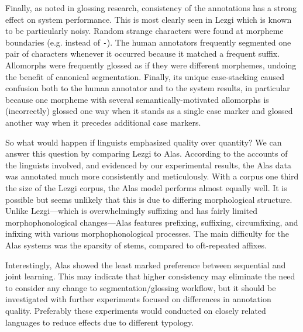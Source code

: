 Finally, as \citet{mcmillan-major_automating_2020} noted in glossing research, consistency of the annotations has a strong effect on system performance. This is most clearly seen in Lezgi which is known to be particularly noisy. Random strange characters were found at morpheme boundaries (e.g. {\tt *} instead of  {\tt -}). The human annotators frequently segmented one pair of characters whenever it occurred because it matched a frequent suffix. Allomorphs were frequently glossed as if they were different morphemes, undoing the benefit of canonical segmentation. Finally, its unique case-stacking caused confusion both to the human annotator and to the system results, in particular because one morpheme with several semantically-motivated allomorphs is (incorrectly) glossed one way when it stands as a single case marker and glossed another way when it precedes additional case markers.

So what would happen if linguists emphasized quality over quantity? We can answer this question by comparing Lezgi to Alas. According to the accounts of the linguists involved, and evidenced by our experimental results, the Alas data was annotated much more consistently and meticulously. With a corpus one third the size of the Lezgi corpus, the Alas model performs almost equally well. It is possible but seems unlikely that this is due to differing morphological structure. Unlike Lezgi---which is overwhelmingly suffixing and has fairly limited morphophonological changes---Alas features prefixing, suffixing, circumfixing, and infixing with various morphophonological processes. The main difficulty for the Alas systems was the sparsity of stems, compared to oft-repeated affixes. 

Interestingly, Alas showed the least marked preference between sequential and joint learning. This may indicate that higher consistency may eliminate the need to consider any change to segmentation/glossing workflow, but it should be investigated with further experiments focused on differences in annotation quality. Preferably these experiments would conducted on closely related languages to reduce effects due to different typology. 



